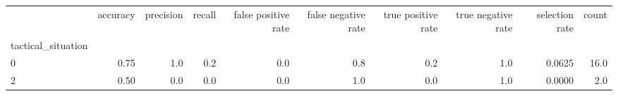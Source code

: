 \begin{tabular}{lrrrrrrrrr}
\toprule
{} &  accuracy &  precision &  recall &  false positive rate &  false negative rate &  true positive rate &  true negative rate &  selection rate &  count \\
tactical\_situation &           &            &         &                      &                      &                     &                     &                 &        \\
\midrule
0                  &      0.75 &        1.0 &     0.2 &                  0.0 &                  0.8 &                 0.2 &                 1.0 &          0.0625 &   16.0 \\
2                  &      0.50 &        0.0 &     0.0 &                  0.0 &                  1.0 &                 0.0 &                 1.0 &          0.0000 &    2.0 \\
\bottomrule
\end{tabular}
